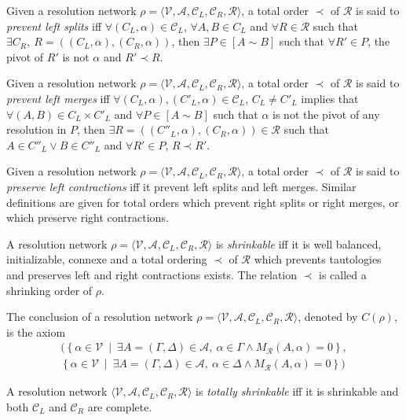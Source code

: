 \documentclass{article}
\newcommand{\ens}[2]{\left\{ #1 ~ \middle| ~ #2 \right\}}
\newcommand{\varSet}{\mathcal{V}}
\newcommand{\axiomSet}{\mathcal{A}}
\newcommand{\conSet}{\mathcal{C}}
\newcommand{\resoSet}{\mathcal{R}}
\newcommand{\resoNet}{\rho}
\newcommand{\resoOrd}{\prec}
\newcommand{\connected}{\sim}
\newcommand{\cpath}[2]{\left[ #1 \connected #2 \right]}
\newcommand{\nConclusion}[1]{C(#1)} %
\newcommand{\connectivity}[3]{M_{#3} \left( #1 , #2 \right)}
\begin{document}
Given a resolution network $\resoNet = \langle \varSet, \axiomSet, \conSet_L, \conSet_R, \resoSet
\rangle$, a total order $\resoOrd$ of $\resoSet$ is said to \emph{prevent left splits} iff
$\forall (C_L,\alpha) \in \conSet_L$, $\forall A, B \in C_L$ and
$\forall R \in \resoSet$ such that $\exists C_R ,~ R = ((C_L,\alpha),(C_R,\alpha))$, then
$\exists P \in \cpath{A}{B}$ such that $\forall R' \in P$, the pivot of $R'$ is
not $\alpha$ and $R' \resoOrd R$.

Given a resolution network $\resoNet = \langle \varSet, \axiomSet, \conSet_L, \conSet_R, \resoSet
\rangle$, a total order $\resoOrd$ of $\resoSet$ is said to \emph{prevent left merges} iff
$\forall (C_L,\alpha), (C'_L,\alpha) \in \conSet_L$, $C_L \neq C'_L$ implies that
$\forall (A,B) \in C_L \times C'_L$ and
$\forall P \in \cpath{A}{B}$ such that $\alpha$ is not the pivot of any resolution in $P$, then
$\exists R = ((C''_L,\alpha),(C_R,\alpha)) \in \resoSet$ such that
$A \in C''_L \vee B \in C''_L$ and $\forall R' \in P$, $R \resoOrd R'$.

Given a resolution network $\resoNet = \langle \varSet, \axiomSet, \conSet_L, \conSet_R, \resoSet
\rangle$, a total order $\resoOrd$ of $\resoSet$ is said to \emph{preserve left contractions} iff
it prevent left splits and left merges. Similar definitions are given for total orders which prevent
right splits or right merges, or which preserve right contractions.

A resolution network $\rho = \langle \varSet, \axiomSet, \conSet_L, \conSet_R, \resoSet \rangle$ is
\emph{shrinkable} iff it is well balanced, initializable, connexe and a total ordering $\resoOrd$ of
$\resoSet$ which prevents tautologies and preserves left and right contractions exists. The relation
$\resoOrd$ is called a shrinking order of $\rho$.

The conclusion of a resolution network $\rho = \langle \varSet, \axiomSet, \conSet_L, \conSet_R,
\resoSet \rangle$, denoted by $\nConclusion{\rho}$, is the axiom
\begin{multline*}
(\ens{\alpha \in \varSet}{\exists A = (\Gamma,\Delta) \in \axiomSet ,~ \alpha \in \Gamma \wedge
\connectivity{A}{\alpha}{\resoSet} = 0}, \\
 \ens{\alpha \in \varSet}{\exists A = (\Gamma,\Delta) \in \axiomSet ,~ \alpha \in \Delta \wedge \connectivity{A}{\alpha}{\resoSet} = 0})
\end{multline*}

A resolution network $\langle \varSet, \axiomSet, \conSet_L, \conSet_R, \resoSet \rangle$ is
\emph{totally shrinkable} iff it is shrinkable and both $\conSet_L$ and $\conSet_R$ are complete.
\end{document}
